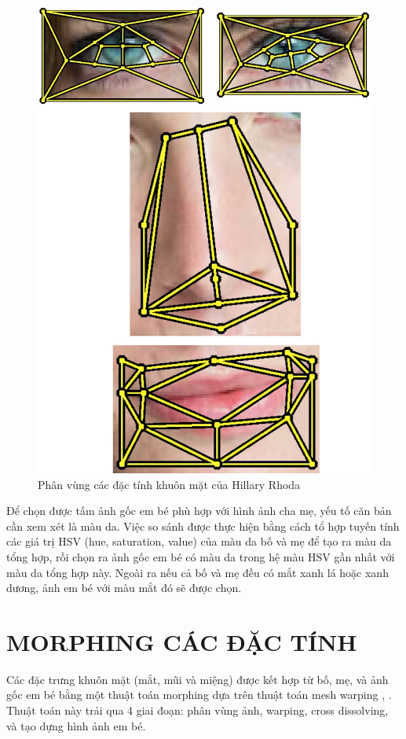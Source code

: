 \documentclass[journal]{IEEEtran}
\begin{document}
\begin{figure}[!t]
\centering
\includegraphics{Images/17}
\caption{Phân vùng các đặc tính khuôn mặt của Hillary Rhoda}
\label{refhinh9}
\end{figure}

Để chọn được tấm ảnh gốc em bé phù hợp với hình ảnh cha mẹ, yếu tố căn bản cần xem xét là màu da. Việc so sánh được thực hiện bằng cách tổ hợp tuyến tính các giá trị HSV (hue, saturation, value) của màu da bố và mẹ để tạo ra màu da tổng hợp, rồi chọn ra ảnh gốc em bé có màu da trong hệ màu HSV gần nhất với màu da tổng hợp này. Ngoài ra nếu cả bố và mẹ đều có mắt xanh lá hoặc xanh dương, ảnh em bé với màu mắt đó sẽ được chọn.

\section{MORPHING CÁC ĐẶC TÍNH}
Các đặc trưng khuôn mặt (mắt, mũi và miệng) được kết hợp từ bố, mẹ, và ảnh gốc em bé bằng một thuật toán morphing dựa trên thuật toán mesh warping \cite{ref:r10}, \cite{ref:r11}. Thuật toán này trải qua 4 giai đoạn: phân vùng ảnh, warping, cross dissolving, và tạo dựng hình ảnh em bé.
\end{document}
